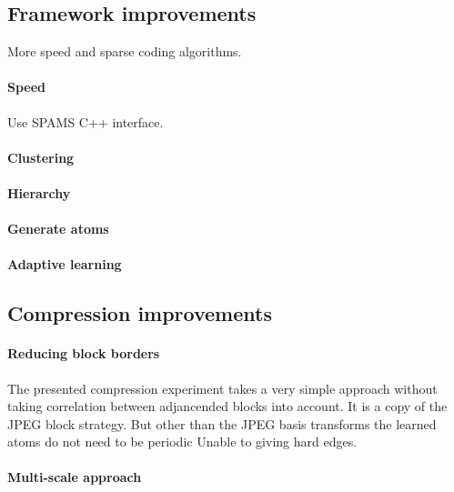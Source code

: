 \subsection{Framework improvements}
More speed and  sparse coding algorithms.
\paragraph{Speed}
Use SPAMS C++ interface.
\paragraph{Clustering}
\paragraph{Hierarchy}
\paragraph{Generate atoms}
\paragraph{Adaptive learning}



\subsection{Compression improvements}
\paragraph{Reducing block borders} The presented compression experiment
takes a very simple approach without taking correlation between adjancended
blocks into account. It is a copy of the JPEG block strategy. But other than
the JPEG basis transforms the learned atoms do not need to be periodic
Unable to giving
hard edges. 


\paragraph{Multi-scale approach}


